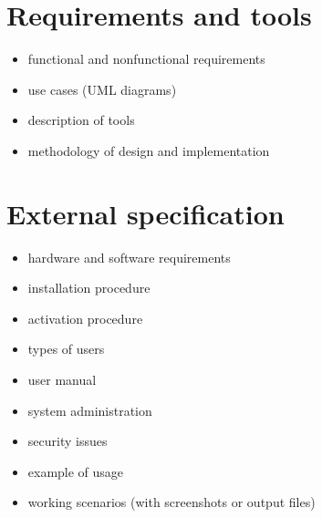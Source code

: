 \documentclass[a4paper,twoside,12pt]{book}
\begin{document}





\chapter{Requirements and tools}

\begin{itemize}
\item functional and nonfunctional requirements
\item use cases (UML diagrams)
\item description of tools
\item methodology of design and implementation
\end{itemize}

\chapter{External specification}
\begin{itemize}
\item hardware and software requirements
\item installation procedure
\item activation procedure
\item types of users
\item user manual
\item system administration
\item security issues
\item example of usage
\item working scenarios (with screenshots or output files)
\end{itemize}
\end{document}
